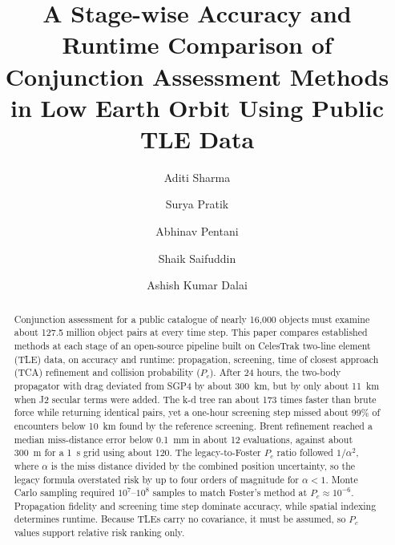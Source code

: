 \documentclass[runningheads]{llncs}
\begin{document}
\title{A Stage-wise Accuracy and Runtime Comparison of Conjunction Assessment Methods in Low Earth Orbit Using Public TLE Data}

\author{Aditi Sharma \and Surya Pratik \and Abhinav Pentani \and Shaik Saifuddin \and Ashish Kumar Dalai}


\maketitle

\begin{abstract}
Conjunction assessment for a public catalogue of nearly 16,000 objects must examine about 127.5 million object pairs at every time step. This paper compares established methods at each stage of an open-source pipeline built on CelesTrak two-line element (TLE) data, on accuracy and runtime: propagation, screening, time of closest approach (TCA) refinement and collision probability ($P_c$). After 24 hours, the two-body propagator with drag deviated from SGP4 by about 300~km, but by only about 11~km when J2 secular terms were added. The k-d tree ran about 173 times faster than brute force while returning identical pairs, yet a one-hour screening step missed about 99\% of encounters below 10~km found by the reference screening. Brent refinement reached a median miss-distance error below 0.1~mm in about 12 evaluations, against about 300~m for a 1~s grid using about 120. The legacy-to-Foster $P_c$ ratio followed $1/\alpha^2$, where $\alpha$ is the miss distance divided by the combined position uncertainty, so the legacy formula overstated risk by up to four orders of magnitude for $\alpha < 1$. Monte Carlo sampling required $10^{7}$--$10^{8}$ samples to match Foster's method at $P_c \approx 10^{-6}$. Propagation fidelity and screening time step dominate accuracy, while spatial indexing determines runtime. Because TLEs carry no covariance, it must be assumed, so $P_c$ values support relative risk ranking only.

\end{abstract}
\end{document}
